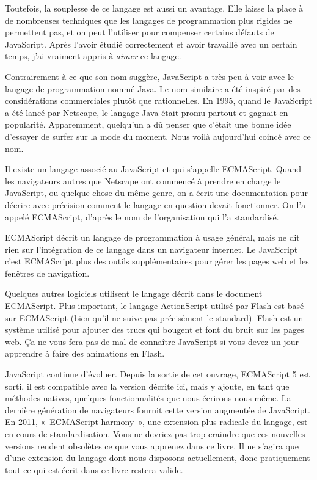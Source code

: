 \documentclass{FramateX}
\begin{document}
Toutefois, la souplesse de ce langage est aussi un avantage. Elle laisse
la place à de nombreuses techniques que les langages de programmation
plus rigides ne permettent pas, et on peut l'utiliser pour compenser
certains défauts de JavaScript. Après l'avoir étudié correctement et
avoir travaillé avec un certain temps, j'ai vraiment appris à
\emph{aimer} ce langage.

\begin{center}\end{center}

Contrairement à ce que son nom suggère, JavaScript a très peu à voir
avec le langage de programmation nommé Java. Le nom similaire a été
inspiré par des considérations commerciales plutôt que rationnelles. En
1995, quand le JavaScript a été lancé par Netscape, le langage Java
était promu partout et gagnait en popularité. Apparemment, quelqu'un a
dû penser que c'était une bonne idée d'essayer de surfer sur la mode du
moment. Nous voilà aujourd'hui coincé avec ce nom.

Il existe un langage associé au JavaScript et qui s'appelle ECMAScript.
Quand les navigateurs autres que Netscape ont commencé à prendre en
charge le JavaScript, ou quelque chose du même genre, on a écrit une
documentation pour décrire avec précision comment le langage en question
devait fonctionner. On l'a appelé ECMAScript, d'après le nom de
l'organisation qui l'a standardisé.

ECMAScript décrit un langage de programmation à usage général, mais ne
dit rien sur l'intégration de ce langage dans un navigateur internet. Le
JavaScript c'est ECMAScript plus des outils supplémentaires pour gérer
les pages web et les fenêtres de navigation.

Quelques autres logiciels utilisent le langage décrit dans le document
ECMAScript. Plus important, le langage ActionScript utilisé par Flash
est basé sur ECMAScript (bien qu'il ne suive pas précisément le
standard). Flash est un système utilisé pour ajouter des trucs qui
bougent et font du bruit sur les pages web. Ça ne vous fera pas de mal
de connaître JavaScript si vous devez un jour apprendre à faire des
animations en Flash.

JavaScript continue d'évoluer. Depuis la sortie de cet ouvrage,
ECMAScript 5 est sorti, il est compatible avec la version décrite ici,
mais y ajoute, en tant que méthodes natives, quelques fonctionnalités
que nous écrirons nous-même. La dernière génération de navigateurs
fournit cette version augmentée de JavaScript. En 2011, «~ECMAScript
harmony~», une extension plus radicale du langage, est en cours de
standardisation. Vous ne devriez pas trop craindre que ces nouvelles
versions rendent obsolètes ce que vous apprenez dans ce livre. Il ne
s'agira que d'une extension du langage dont nous disposons actuellement,
donc pratiquement tout ce qui est écrit dans ce livre restera valide.
\end{document}
